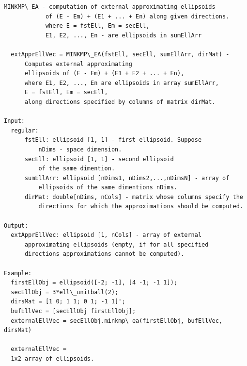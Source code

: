 \documentclass[letterpaper,10pt,english]{sphinxmanual}
\begin{document}
\begin{Verbatim}[commandchars=\\\{\}]
MINKMP\_EA - computation of external approximating ellipsoids
            of (E - Em) + (E1 + ... + En) along given directions.
            where E = fstEll, Em = secEll,
            E1, E2, ..., En - are ellipsoids in sumEllArr

  extApprEllVec = MINKMP\_EA(fstEll, secEll, sumEllArr, dirMat) -
      Computes external approximating
      ellipsoids of (E - Em) + (E1 + E2 + ... + En),
      where E1, E2, ..., En are ellipsoids in array sumEllArr,
      E = fstEll, Em = secEll,
      along directions specified by columns of matrix dirMat.

Input:
  regular:
      fstEll: ellipsoid [1, 1] - first ellipsoid. Suppose
          nDims - space dimension.
      secEll: ellipsoid [1, 1] - second ellipsoid
          of the same dimention.
      sumEllArr: ellipsoid [nDims1, nDims2,...,nDimsN] - array of
          ellipsoids of the same dimentions nDims.
      dirMat: double[nDims, nCols] - matrix whose columns specify the
          directions for which the approximations should be computed.

Output:
  extApprEllVec: ellipsoid [1, nCols] - array of external
      approximating ellipsoids (empty, if for all specified
      directions approximations cannot be computed).

Example:
  firstEllObj = ellipsoid([-2; -1], [4 -1; -1 1]);
  secEllObj = 3*ell\_unitball(2);
  dirsMat = [1 0; 1 1; 0 1; -1 1]';
  bufEllVec = [secEllObj firstEllObj];
  externalEllVec = secEllObj.minkmp\_ea(firstEllObj, bufEllVec, dirsMat)

  externalEllVec =
  1x2 array of ellipsoids.
\end{Verbatim}
\end{document}
